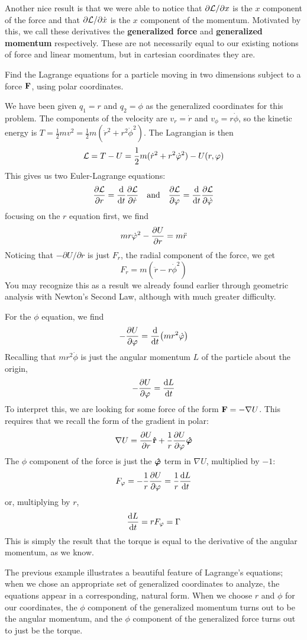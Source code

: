 Another nice result is that we were able to notice that $\partial \mathcal{L} / \partial x$ is the $x$ component of the force and that $\partial \mathcal{L}/\partial \dot x$ is the $x$ component of the momentum. Motivated by this, we call these derivatives the \textbf{generalized force} and \textbf{generalized momentum} respectively. These are not necessarily equal to our existing notions of force and linear momentum, but in cartesian coordinates they are. 
\begin{example}
     Find the Lagrange equations for a particle moving in two dimensions subject to a force $\mathbf{F}$, using polar coordinates.

     We have been given $q_1 = r$ and $q_2 = \phi$ as the generalized coordinates for this problem. The components of the velocity are $v_r = \dot r$ and $v_\phi = r\dot\phi$, so the kinetic energy is $T = \frac{1}{2}mv^2 = \frac{1}{2}m(\dot r^2 + r^2\dot\phi^2)$. The Lagrangian is then
     \[ \mathcal{L} = T - U = \frac{1}{2}m(\dot r^2 + r^2\dot {\varphi}^2) - U(r, \varphi) \]
     This gives us two Euler-Lagrange equations:
     \[ \pdv{\mathcal{L}}{r} = \dv{t} \pdv{\mathcal{L}}{\dot r} \quad\text{and}\quad \pdv{\mathcal{L}}{\varphi} = \dv{t} \pdv{\mathcal{L}}{\dot{\varphi}} \]
     focusing on the $r$ equation first, we find
     \[ mr\dot{\varphi}^2 -\pdv{U}{r} = m\ddot r\]
     Noticing that $-\partial U/\partial r$ is just $F_r$, the radial component of the force, we get
     \[ F_r = m(\ddot r - r\dot\phi^2) \]
     You may recognize this as a result we already found earlier through geometric analysis with Newton's Second Law, although with much greater difficulty. 

     For the $\phi$ equation, we find
     \[ -\pdv{U}{\varphi} = \dv{t} (mr^2\dot{\varphi}) \]
     Recalling that $mr^2\dot\phi$ is just the angular momentum $L$ of the particle about the origin,
     \[ -\pdv{U}{\varphi} = \dv{L}{t} \]
     To interpret this, we are looking for some force of the form $\mathbf{F} = - \nabla U$. This requires that we recall the form of the gradient in polar:
     \[ \nabla U = \pdv{U}{r}\mathbf{\hat{r}} + \frac{1}{r} \pdv{U}{\varphi}\bm{\hat{\varphi}} \]
     The $\phi$ component of the force is just the $\bm{\hat{\varphi}}$ term in $\nabla U$, multiplied by $-1$:
     \[ F_\varphi = -\frac{1}{r}\pdv{U}{\varphi} = \frac{1}{r}\dv{L}{t} \]
     or, multiplying by $r$,
     \[ \dv{L}{t} = rF_\varphi = \Gamma \]
     This is simply the result that the torque is equal to the derivative of the angular momentum, as we know. 
\end{example}
The previous example illustrates a beautiful feature of Lagrange's equations; when we chose an appropriate set of generalized coordinates to analyze, the equations appear in a corresponding, natural form.  When we choose $r$ and $\phi$ for our coordinates, the $\phi$ component of the generalized momentum turns out to be the angular momentum, and the $\phi$ component of the generalized force turns out to just be the torque. 

